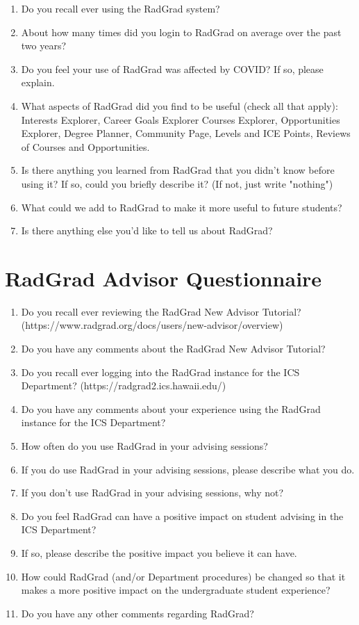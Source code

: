 \documentclass[acmsmall,nonacm]{acmart}
\begin{document}
\begin{enumerate}[leftmargin=*]
\item Do you recall ever using the RadGrad system?
\item About how many times did you login to RadGrad on average over the past two years?
\item Do you feel your use of RadGrad was affected by COVID? If so, please explain.
\item What aspects of RadGrad did you find to be useful (check all that apply): Interests Explorer, Career Goals Explorer Courses Explorer, Opportunities Explorer, Degree Planner, Community Page, Levels and ICE Points, Reviews of Courses and Opportunities.
\item Is there anything you learned from RadGrad that you didn't know before using it? If so, could you briefly describe it? (If not, just write "nothing")
\item What could we add to RadGrad to make it more useful to future students?
\item Is there anything else you'd like to tell us about RadGrad?
\end{enumerate}

\section{RadGrad Advisor Questionnaire}
\label{sec:advisor-questionnaire}

\begin{enumerate}[leftmargin=*]
\item Do you recall ever reviewing the RadGrad New Advisor Tutorial? \newline (https://www.radgrad.org/docs/users/new-advisor/overview)
\item Do you have any comments about the RadGrad New Advisor Tutorial?
\item Do you recall ever logging into the RadGrad instance for the ICS Department? \newline (https://radgrad2.ics.hawaii.edu/)
\item Do you have any comments about your experience using the RadGrad instance for the ICS Department?
\item How often do you use RadGrad in your advising sessions?
\item If you do use RadGrad in your advising sessions, please describe what you do.
\item If you don't use RadGrad in your advising sessions, why not?
\item Do you feel RadGrad can have a positive impact on student advising in the ICS Department?
\item If so, please describe the positive impact you believe it can have.
\item How could RadGrad (and/or Department procedures) be changed so that it makes a more positive impact on the undergraduate student experience?
\item Do you have any other comments regarding RadGrad?
\end{enumerate}
\end{document}
